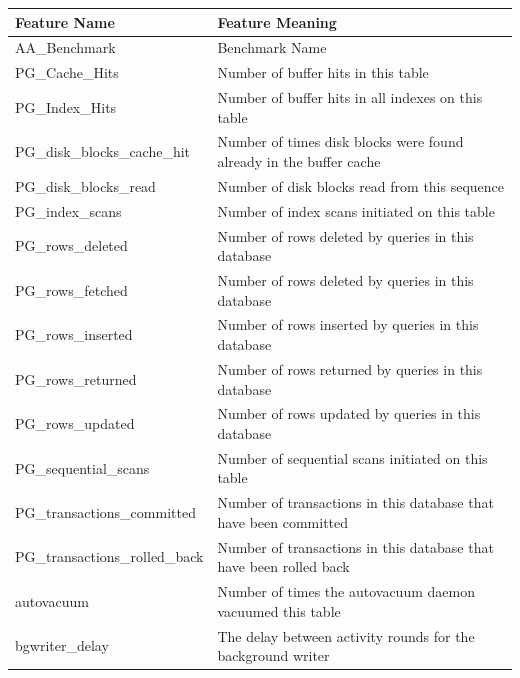 \begin{table}[t]
  \begin{adjustbox}{max width=\textwidth}
    \begin{tabular}{ll}
      \toprule
      Feature Name                   & Feature Meaning                                                     \\
      \midrule
      AA\_Benchmark                  & Benchmark Name                                                      \\
      PG\_Cache\_Hits                & Number of buffer hits in this table                                 \\
      PG\_Index\_Hits                & Number of buffer hits in all indexes on this table                  \\
      PG\_disk\_blocks\_cache\_hit   & Number of times disk blocks were found already in the buffer cache  \\
      PG\_disk\_blocks\_read         & Number of disk blocks read from this sequence                       \\
      PG\_index\_scans               & Number of index scans initiated on this table                       \\
      PG\_rows\_deleted              & Number of rows deleted by queries in this database                  \\
      PG\_rows\_fetched              & Number of rows deleted by queries in this database                  \\
      PG\_rows\_inserted             & Number of rows inserted by queries in this database                 \\
      PG\_rows\_returned             & Number of rows returned by queries in this database                 \\
      PG\_rows\_updated              & Number of rows updated by queries in this database                  \\
      PG\_sequential\_scans          & Number of sequential scans initiated on this table                  \\
      PG\_transactions\_committed    & Number of transactions in this database that have been committed    \\
      PG\_transactions\_rolled\_back & Number of transactions in this database that have been rolled back  \\
      autovacuum                     & Number of times the autovacuum daemon vacuumed this table           \\
      bgwriter\_delay                & The delay between activity rounds for the background writer         \\

\end{tabular}
\end{adjustbox}
\end{table}
